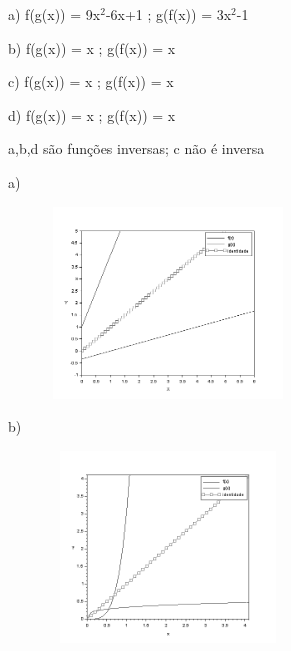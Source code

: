 \begin{respostas}{6}
\begin{multicols}{2}
    \ansitem{}
        a) f(g(x)) = 9x$^2$-6x+1 ; g(f(x)) = 3x$^2$-1
        
        b) f(g(x)) = x ; g(f(x)) = x

        c) f(g(x)) = x ; g(f(x)) = x
        
        d) f(g(x)) = x ; g(f(x)) = x

    \ansitem{} a,b,d são funções inversas; c não é inversa

    \ansitem{}

    a)\begin{figure}[H]
        \begin{Center}
	    \includegraphics[width=2.5in,height=2in]{capitulos/logaritmos_e_funcao_logaritmica/media/image13.png}
        \end{Center}
    \end{figure}

    b)\begin{figure}[H]
        \begin{Center}
        \includegraphics[width=2.5in,height=2in]{capitulos/logaritmos_e_funcao_logaritmica/media/image14.png}
        \end{Center}
    \end{figure}
    

\end{multicols}
\end{respostas}
